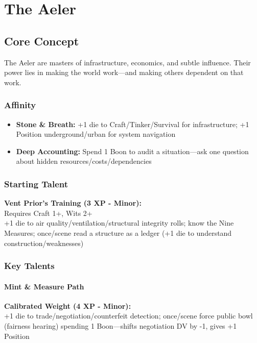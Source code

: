 \documentclass[11pt]{book}
\newcommand{\talent}[1]{\textbf{#1}}
\begin{document}



\tableofcontents
\newpage

\part{The Aeler}

\chapter{Core Concept}
The Aeler are masters of infrastructure, economics, and subtle influence. Their power lies in making the world work---and making others dependent on that work.

\section{Affinity}
\begin{itemize}
    \item \textbf{Stone \& Breath:} +1 die to Craft/Tinker/Survival for infrastructure; +1 Position underground/urban for system navigation
    \item \textbf{Deep Accounting:} Spend 1 Boon to audit a situation---ask one question about hidden resources/costs/dependencies
\end{itemize}

\section{Starting Talent}
\talent{Vent Prior's Training (3 XP - Minor):} \\
Requires Craft 1+, Wits 2+ \\
+1 die to air quality/ventilation/structural integrity rolls; know the Nine Measures; once/scene read a structure as a ledger (+1 die to understand construction/weaknesses)

\section{Key Talents}
\subsection*{Mint \& Measure Path}
\talent{Calibrated Weight (4 XP - Minor):} \\
+1 die to trade/negotiation/counterfeit detection; once/scene force public bowl (fairness hearing) spending 1 Boon---shifts negotiation DV by -1, gives +1 Position
\end{document}
